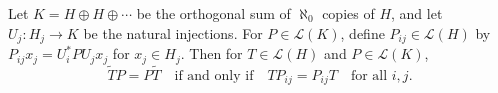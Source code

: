 \begin{lemma}
Let $K = H \oplus H \oplus \cdots$ be the orthogonal sum of $\aleph_0$ copies of $H$, and let $U_j : H_j \to K$ be the natural injections. For $P \in \mathcal{L}(K)$, define $P_{ij} \in \mathcal{L}(H)$ by $P_{ij} x_j = U_i^* P U_j x_j$ for $x_j \in H_j$. Then for $T \in \mathcal{L}(H)$ and $P \in \mathcal{L}(K)$,
$$\tilde{T}P = P\tilde{T} \quad \text{if and only if} \quad T P_{ij} = P_{ij} T \quad \text{for all } i,j.$$
\end{lemma}
